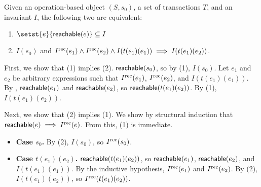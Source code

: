 \begin{claim}
  Given an operation-based object $(S, s_0)$, a set of transactions $T$, and an
  invariant $I$, the following two are equivalent:
  \begin{enumerate}[\quad(1)]
    \item
      $\setst{e}{\reachable{e}} \subseteq I$

    \item
      $I(s_0)$ and $I^{\text{rec}}(e_1) \land I^{\text{rec}}(e_2) \land I(t(e_1)(e_1)) \implies
      I(t(e_1)(e_2))$.
  \end{enumerate}
\end{claim}
\begin{elidableproof}
  First, we show that (1) implies (2). $\textsf{reachable}(s_0)$, so by (1), $I(s_0)$.
  Let $e_1$ and $e_2$ be arbitrary expressions such that $I^{\text{rec}}(e_1)$,
  $I^{\text{rec}}(e_2)$, and $I(t(e_1)(e_1))$. By ,
  $\textsf{reachable}(e_1)$ and $\textsf{reachable}(e_2)$, so $\textsf{reachable}(t(e_1)(e_2))$. By
  (1), $I(t(e_1)(e_2))$.

  Next, we show that (2) implies (1). We show by structural induction that
  $\textsf{reachable}(e) \implies I^{\text{rec}}(e)$. From this, (1) is immediate.
  \begin{itemize}
    \item \textbf{Case $s_0$.}
      By (2), $I(s_0)$, so $I^{\text{rec}}(s_0)$.

    \item \textbf{Case $t(e_1)(e_2)$.}
      $\textsf{reachable}(t(e_1)(e_2))$, so $\textsf{reachable}(e_1)$, $\textsf{reachable}(e_2)$, and
      $I(t(e_1)(e_1))$. By the inductive hypothesis, $I^{\text{rec}}(e_1)$ and
      $I^{\text{rec}}(e_2)$. By (2), $I(t(e_1)(e_2))$, so $I^{\text{rec}}(t(e_1)(e_2))$.
  \end{itemize}
\end{elidableproof}
